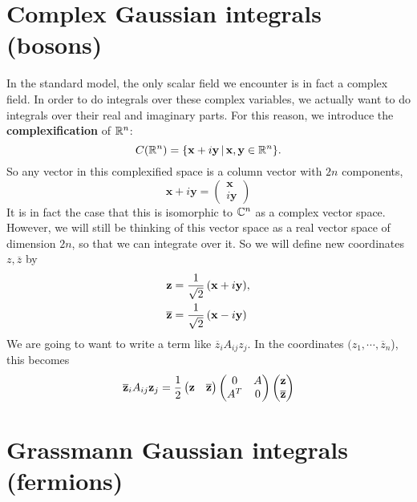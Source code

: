 \documentclass{book}
\begin{document}
\section{Complex Gaussian integrals (bosons)}
In the standard model, the only scalar field we encounter is in fact a complex field. In order to do integrals over these complex variables, we actually want to do integrals over their real and imaginary parts. For this reason, we introduce the \textbf{complexification} of $\mathbb{R}^n$:
\[
C(\mathbb{R}^n) = \{\mathbf{x} + i\mathbf{y} \, \vert \, \mathbf{x},\mathbf{y} \in \mathbb{R}^n \}.
\]
So any vector in this complexified space is a column vector with $2n$ components,
\[
\mathbf{x} + i\mathbf{y} = \begin{pmatrix}
\mathbf{x} \\
i\mathbf{y}
\end{pmatrix}
\]
It is in fact the case that this is isomorphic to $\mathbb{C}^n$ as a complex vector space. However, we will still be thinking of this vector space as a real vector space of dimension $2n$, so that we can integrate over it. So we will define new coordinates $z,\overline{z}$ by
\begin{align*}
\mathbf{z} = \frac{1}{\sqrt{2}} \left( \mathbf{x} + i\mathbf{y} \right) &, \\
\overline{\mathbf{z}} = \frac{1}{\sqrt{2}} \left(\mathbf{x} -i \mathbf{y} \right)&
\end{align*}
We are going to want to write a term like $\overline{z}_i A_{ij} z_j$. In the coordinates $(z_1,\cdots,\overline{z}_n$), this becomes
\[
\overline{\mathbf{z}}_i A_{ij} \mathbf{z}_j = \frac{1}{2}
\begin{pmatrix} 
\mathbf{z} & \overline{\mathbf{z}}
\end{pmatrix}
\begin{pmatrix}
0 & A \\
A^T & 0
\end{pmatrix}
\begin{pmatrix}
\mathbf{z}\\ 
\overline{\mathbf{z}}
\end{pmatrix}
\]
\section{Grassmann Gaussian integrals (fermions)}

\newpage
\end{document}
